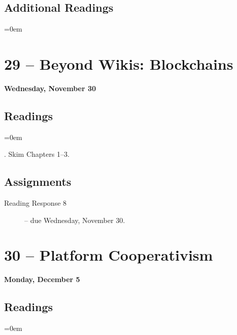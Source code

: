 \documentclass[11pt]{memoir}
\newenvironment{readinglist}{
\begin{list}{}{\leftmargin=8pt \itemindent=0em}
  \setlength{\itemsep}{8pt}
  \setlength{\parskip}{0em}
  \setlength{\parsep}{1em}
  \setlength{\parindent}{8em}}
{\end{list}}
\begin{document}
    \subsection{Additional Readings}
    \begin{readinglist}
        \item {}
        \item {}
        \item {}
        \item {}
    \end{readinglist}

\section{29 -- Beyond Wikis: Blockchains}
\textcolor{CUGold}{\textbf{Wednesday, November 30}}

    \subsection{Readings}
    \begin{readinglist}
        \item {}. Skim Chapters 1--3.
    \end{readinglist}
    
    \subsection{Assignments}
    \begin{description}%
        \item[Reading Response 8 ] -- due Wednesday, November 30. 
    \end{description}
    
\section{30 -- Platform Cooperativism}
\textcolor{CUGold}{\textbf{Monday, December 5}}

    \subsection{Readings}
    \begin{readinglist}
        \item {}
        \item {}
    \end{readinglist}
\end{document}
